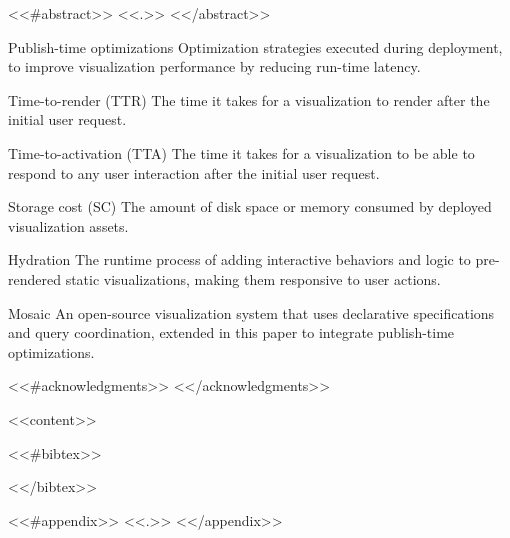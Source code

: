 \documentclass[<<class_options>>]{template-thesis}
\numberwithin{figure}{section}
\numberwithin{table}{section}
\renewenvironment{glossary}
  {\begin{list}{}{\setlength\itemindent{\parindent}
   \def\makelabel##1{\footnotesize\uppercase{##1:}\hfill}\uwsinglespace}}
  {\end{list}}
\begin{document}
<<#abstract>>
<<.>>
<</abstract>>
\vspace*{\fill}

\vspace*{\fill}

\clearpage
\thispagestyle{plain}
\tableofcontents

\clearpage
\thispagestyle{plain}
\listoffigures

\clearpage
\thispagestyle{plain}
\listoftables

\clearpage
\glossarysection

\begin{glossary}
\item[Publish-time optimizations] Optimization strategies executed during deployment, to improve visualization performance by reducing run-time latency.
\item[Time-to-render (TTR)] The time it takes for a visualization to render after the initial user request.
\item[Time-to-activation (TTA)] The time it takes for a visualization to be able to respond to any user interaction after the initial user request.
\item[Storage cost (SC)] The amount of disk space or memory consumed by deployed visualization assets.
\item[Hydration] The runtime process of adding interactive behaviors and logic to pre-rendered static visualizations, making them responsive to user actions.
\item[Mosaic] An open-source visualization system that uses declarative specifications and query coordination, extended in this paper to integrate publish-time optimizations.
\end{glossary}

\clearpage

\clearpage
<<#acknowledgments>>
<</acknowledgments>>


\clearpage
{}
\setcounter{secnumdepth}{2} %
\pagestyle{myheadings}

<<content>>

<<#bibtex>>
\clearpage
{}


<</bibtex>>

<<#appendix>>
\appendix
<<.>>
<</appendix>>
\end{document}
